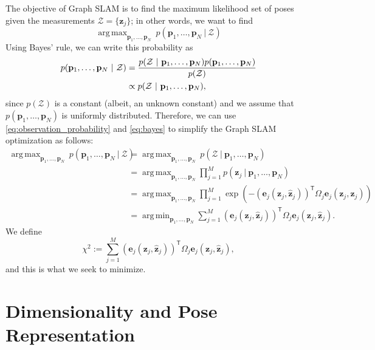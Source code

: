 \documentclass{article}
\DeclareMathOperator*{\argmax}{arg\,max}
\DeclareMathOperator*{\argmin}{arg\,min}
\newcommand{\transp}{{\scriptstyle{\mathsf{T}}}}
\begin{document}
The objective of Graph SLAM is to find the maximum likelihood set of poses given the measurements $\mathcal{Z} = \{\mathbf{z}_j\}$; in other words, we want to find 
%
\begin{equation*}
    \argmax_{\mathbf{p}_1, \ldots, \mathbf{p}_N} \ p(\mathbf{p}_1, \ldots, \mathbf{p}_N \ | \ \mathcal{Z}) 
\end{equation*}
%
Using Bayes' rule, we can write this probability as
%
\begin{align}
    p(\mathbf{p}_1, \ldots, \mathbf{p}_N \ | \ \mathcal{Z}) &= \frac{p( \mathcal{Z} \ | \ \mathbf{p}_1, \ldots, \mathbf{p}_N) p(\mathbf{p}_1, \ldots, \mathbf{p}_N) }{ p(\mathcal{Z}) } \notag \\
    &\propto p( \mathcal{Z} \ | \ \mathbf{p}_1, \ldots, \mathbf{p}_N), \label{eq:bayes}
\end{align}
%
since $p(\mathcal{Z})$ is a constant (albeit, an unknown constant) and we assume that $p(\mathbf{p}_1, \ldots, \mathbf{p}_N)$ is uniformly distributed.  Therefore, we can use \eqref{eq:observation_probability} and \eqref{eq:bayes} to simplify the Graph SLAM optimization as follows:
%
\begin{align*}
    \argmax_{\mathbf{p}_1, \ldots, \mathbf{p}_N} \ p(\mathbf{p}_1, \ldots, \mathbf{p}_N \ | \ \mathcal{Z}) &= \argmax_{\mathbf{p}_1, \ldots, \mathbf{p}_N} \ p( \mathcal{Z} \ | \ \mathbf{p}_1, \ldots, \mathbf{p}_N) \\
    &= \argmax_{\mathbf{p}_1, \ldots, \mathbf{p}_N} \prod_{j=1}^M p(\mathbf{z}_j \ | \ \mathbf{p}_1, \ldots, \mathbf{p}_N) \\
    &= \argmax_{\mathbf{p}_1, \ldots, \mathbf{p}_N} \prod_{j=1}^M \exp \left( -(\mathbf{e}_j(\mathbf{z}_j, \hat{\mathbf{z}}_j))^\transp \Omega_j \mathbf{e}_j(\mathbf{z}_j, \hat{\mathbf{z}}_j) \right) \\
    &= \argmin_{\mathbf{p}_1, \ldots, \mathbf{p}_N} \sum_{j=1}^M (\mathbf{e}_j(\mathbf{z}_j, \hat{\mathbf{z}}_j))^\transp \Omega_j \mathbf{e}_j(\mathbf{z}_j, \hat{\mathbf{z}}_j).
\end{align*}
%
We define
%
\begin{equation*}
    \chi^2 := \sum_{j=1}^M (\mathbf{e}_j(\mathbf{z}_j, \hat{\mathbf{z}}_j))^\transp \Omega_j \mathbf{e}_j(\mathbf{z}_j, \hat{\mathbf{z}}_j),
\end{equation*}
%
and this is what we seek to minimize.


\section{Dimensionality and Pose Representation}
\end{document}
